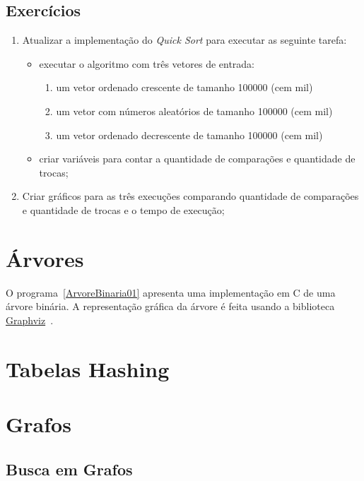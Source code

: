 \documentclass[11pt,fleqn]{book} %
\begin{document}
\subsection*{Exercícios}
\begin{enumerate}
	\item Atualizar a implementação do \textit{Quick Sort} para executar as seguinte tarefa:
	\begin{itemize}
		\item executar o algoritmo com três vetores de entrada:
		\begin{enumerate}
			\item um vetor ordenado crescente de tamanho 100000 (cem mil)
			\item um vetor com números aleatórios de tamanho 100000 (cem mil)
			\item um vetor ordenado decrescente de tamanho 100000 (cem mil)
		\end{enumerate} 
		\item criar variáveis para contar a quantidade de comparações e quantidade de trocas;
	\end{itemize} 
	\item Criar gráficos para as três execuções comparando quantidade de comparações e quantidade de trocas e o tempo de execução;
\end{enumerate} 

\newpage
\section{Árvores}\label{arvores}

O  programa~\ref{ArvoreBinaria01} apresenta uma implementação em C de uma árvore binária.
A representação gráfica da árvore é feita usando a biblioteca \href{http://graphviz.org/}{Graphviz}~\cite{Ellson03graphvizand}.

\label{ArvoreBinaria01}

\section{Tabelas Hashing}\label{hashing}

\section{Grafos}\label{grafos}

\subsection{Busca em Grafos}
\end{document}
